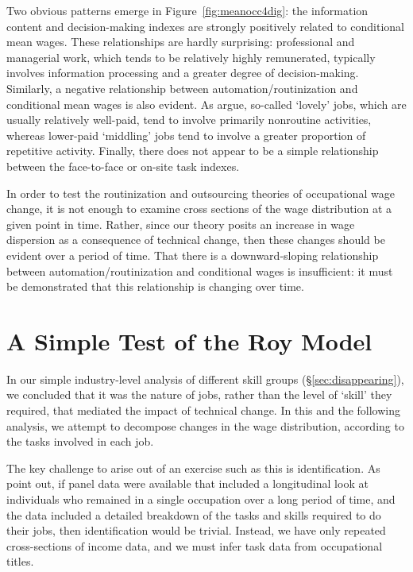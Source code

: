 Two obvious patterns emerge in Figure~\ref{fig:meanocc4dig}: the information content and decision-making indexes are strongly positively related to conditional mean wages. These relationships are hardly surprising: professional and managerial work, which tends to be relatively highly remunerated, typically involves information processing and a greater degree of decision-making. Similarly, a negative relationship between automation/routinization and conditional mean wages is also evident. As \citet{Goos2009} argue, so-called `lovely' jobs, which are usually relatively well-paid, tend to involve primarily nonroutine activities, whereas lower-paid `middling' jobs tend to involve a greater proportion of repetitive activity. Finally, there does not appear to be a simple relationship between the face-to-face or on-site task indexes.

In order to test the routinization and outsourcing theories of occupational wage change, it is not enough to examine cross sections of the wage distribution at a given point in time. Rather, since our theory posits an increase in wage dispersion as a consequence of technical change, then these changes should be evident over a period of time. That there is a downward-sloping relationship between automation/routinization and conditional wages is insufficient: it must be demonstrated that this relationship is changing over time.

\section{A Simple Test of the Roy Model}\label{sec:direct}

In our simple industry-level analysis of different skill groups (\S\ref{sec:disappearing}), we concluded that it was the nature of jobs, rather than the level of `skill' they required, that mediated the impact of technical change. In this and the following analysis, we attempt to decompose changes in the wage distribution, according to the tasks involved in each job.

The key challenge to arise out of an exercise such as this is identification. As \citet{Fortin2011} point out, if panel data were available that included a longitudinal look at individuals who remained in a single occupation over a long period of time, and the data included a detailed breakdown of the tasks and skills required to do their jobs, then identification would be trivial. Instead, we have only repeated cross-sections of income data, and we must infer task data from occupational titles. 

